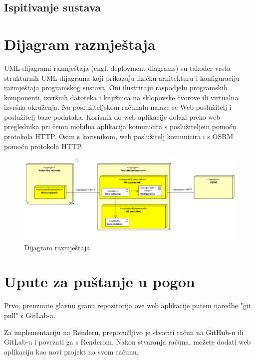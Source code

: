 \subsection{Ispitivanje sustava}

\eject 


\section{Dijagram razmještaja}


UML-dijagrami razmještaja (engl. deployment diagrams) su takoder vrsta strukturnih UML-dijagrama koji prikazuju fizičku arhitekturu i konfiguraciju razmještaja programskog sustava. Oni ilustriraju raspodjelu programskih komponenti, izvršnih datoteka i knjižnica na sklopovske čvorove ili virtualna izvršna okruženja.
Na poslužiteljskom računalu nalaze se Web poslužitelj i poslužitelj baze podataka. Korisnik do web aplikacije dolazi preko web preglednika pri čemu mobilna aplikacija komunicira s poslužiteljem pomoću protokola HTTP. Osim s korisnikom, web poslužitelj komunicira i s OSRM pomoću protokola HTTP.

\vspace{5cm}

\begin{figure}[H]
	\includegraphics[width=\textwidth]{slike/dijagram_razmjestaja.png} %
	\centering
	\caption{Dijagram razmještaja}
	\label{fig:dijagramaktivnosti}
\end{figure}
\eject 

\section{Upute za puštanje u pogon}

Prvo, preuzmite glavnu granu repozitorija ove web aplikacije putem naredbe "git pull" s GitLab-a.

Za implementaciju na Renderu, preporučljivo je stvoriti račun na GitHub-u ili GitLab-u i povezati ga s Renderom. Nakon stvaranja računa, možete dodati web aplikaciju kao novi projekt na svom računu.

